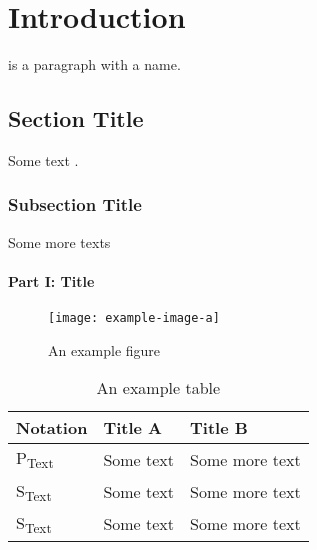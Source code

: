 \chapter{Introduction}\label{ch:\CHID}
\lipsum[1-4]

 is a paragraph with a name.

\section{Section Title}
Some text \cite{grant2014cvx}.
\subsection{Subsection Title}
Some more texts
\subsubsection{Part I: Title}
\begin{figure}[t]
	\centering
	\texttt{[image: example-image-a]}
	\caption{An example figure}\label{\CHID_fig:SL}
\end{figure}

\begin{table}[!t]
	\caption{An example table}
	\label{\CHID_tb:sequence}
	\centering
	\begin{tabular}{|l|l|l|}
		\hline\hline
		Notation & Title A & Title B \\
		\hline\hline
		P\textsubscript{Text} & Some text & Some more text  \\ \hline
		S\textsubscript{Text}  & Some text & Some more text \\ \hline
		S\textsubscript{Text}  & Some text & Some more text\\ 
		\hline\hline
	\end{tabular}
	\vspace{5pt}
\end{table}

